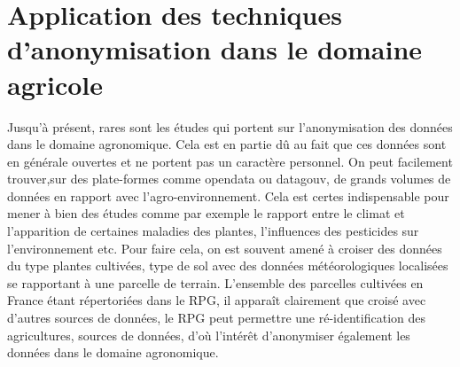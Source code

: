 \chapter{Application des techniques d'anonymisation dans le domaine agricole}
Jusqu'à présent, rares sont les études qui portent sur l'anonymisation des données dans le domaine agronomique.
Cela est en partie dû au fait que ces données sont en générale ouvertes et ne portent pas un caractère personnel. On peut facilement trouver,sur des plate-formes comme opendata ou datagouv, de grands volumes de données en rapport avec l'agro-environnement\cite{bouaziz_tome_nodate}. Cela est certes indispensable pour mener à bien des études comme par exemple le rapport entre le climat et l'apparition de certaines maladies des plantes, l'influences des pesticides sur l'environnement etc. 
Pour faire cela, on est souvent amené à croiser des données du type plantes cultivées, type de sol avec des données météorologiques localisées se rapportant à une parcelle de terrain. L'ensemble des parcelles cultivées en France étant répertoriées dans le \gls{RPG}, il apparaît clairement que croisé avec d'autres sources de données, le RPG peut permettre une ré-identification des agricultures, sources de données, d'où l'intérêt d'anonymiser également les données dans le domaine agronomique.


